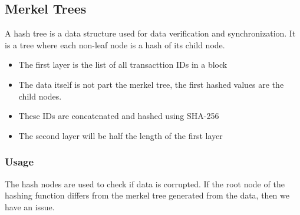 \documentclass[11pt]{article}
\begin{document}
\subsection{Merkel Trees}
\label{sec:org64c4d7a}
A hash tree is a data structure used for data verification and synchronization. It is a tree where each non-leaf node is a hash of its child node.
\begin{itemize}
\item The first layer is the list of all transacttion IDs in a block
\item The data itself is not part the merkel tree, the first hashed values are the child nodes.
\item These IDs are concatenated and hashed using SHA-256
\item The second layer will be half the length of the first layer
\end{itemize}
\subsubsection{Usage}
\label{sec:org2e91e54}
The hash nodes are used to check if data is corrupted. If the root node of the hashing function differs from the merkel tree generated from the data, then we have an issue.
\end{document}
